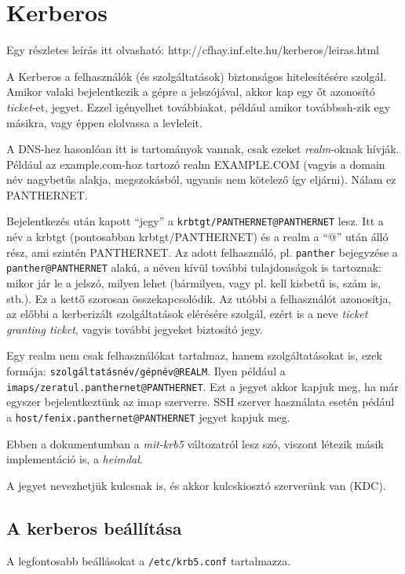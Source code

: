 \chapter{Kerberos}\label{cha:kerberos}

Egy részletes leírás itt olvasható: http://cfhay.inf.elte.hu/kerberos/leiras.html

A Kerberos a felhasználók (és szolgáltatások) biztonságos hitelesítésére szolgál. Amikor valaki bejelentkezik a gépre
a jelszójával, akkor kap egy őt azonosító \emph{ticket}-et, jegyet. Ezzel igényelhet továbbiakat, például amikor
továbbssh-zik egy másikra, vagy éppen elolvassa a levleleit.

A DNS-hez hasonlóan itt is tartományok vannak, csak ezeket \emph{realm}-oknak hívják. Például az example.com-hoz
tartozó realm EXAMPLE.COM (vagyis a domain név nagybetűs alakja, megszokásból, ugyanis nem kötelező így
eljárni). Nálam ez PANTHERNET.

Bejelentkezés után kapott ``jegy'' a \texttt{krbtgt/PANTHERNET@PANTHERNET} lesz. Itt a név a krbtgt (pontosabban
krbtgt/PANTHERNET) és a realm a ``@'' után álló rész, ami szintén PANTHERNET. Az adott felhasználó,
pl. \texttt{panther} bejegyzése a \texttt{panther@PANTHERNET} alakú, a néven kívül további tulajdonságok is tartoznak:
mikor jár le a jelszó, milyen lehet (bármilyen, vagy pl. kell kisbetű is, szám is, stb.). Ez a kettő szorosan
összekapcsolódik. Az utóbbi a felhasználót azonosítja, az előbbi a kerberizált szolgáltatások elérésére szolgál, ezért
is a neve \emph{ticket granting ticket}, vagyis további jegyeket biztosító jegy.

Egy realm nem csak felhasználókat tartalmaz, hanem szolgáltatásokat is, ezek formája:
\texttt{szolgáltatásnév/gépnév@REALM}. Ilyen például a \texttt{imaps/zeratul.panthernet@PANTHERNET}. Ezt a jegyet
akkor kapjuk meg, ha már egyszer bejelentkeztünk az imap szerverre. SSH szerver használata esetén pédául a
\texttt{host/fenix.panthernet@PANTHERNET} jegyet kapjuk meg.

Ebben a dokumentumban a \emph{mit-krb5} változatról lesz szó, viszont létezik másik implementáció is, a \emph{heimdal}.

A jegyet nevezhetjük kulcsnak is, és akkor kulcskiosztó szerverünk van (KDC).
\section{A kerberos beállítása}
A legfontosabb beállásokat a \texttt{/etc/krb5.conf} tartalmazza.

